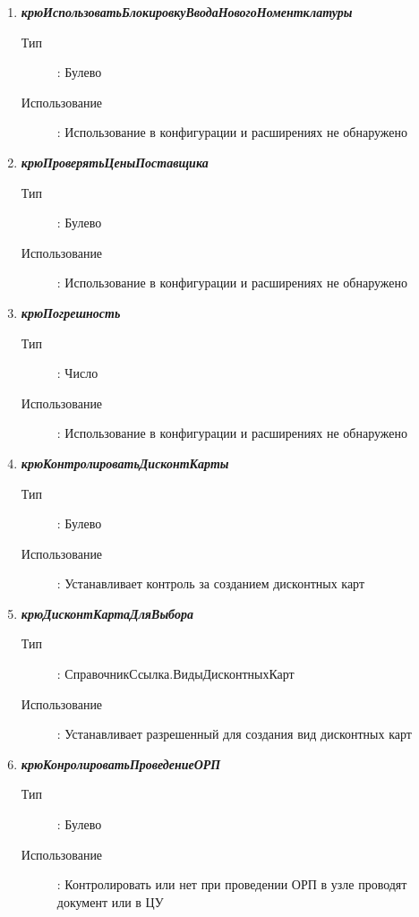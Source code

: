 \begin{enumerate}[label=(\arabic*)]
\vspace{\baselineskip}
\item \textbf{\textit{крюИспользоватьБлокировкуВводаНовогоНоментклатуры}}
\begin{description}
	\item[Тип] : Булево
	\item[Использование]: Использование в конфигурации и расширениях не обнаружено
\end{description}


\vspace{\baselineskip}
\item \textbf{\textit{крюПроверятьЦеныПоставщика}}
\begin{description}
	\item[Тип] : Булево
	\item[Использование]: Использование в конфигурации и расширениях не обнаружено
\end{description}

\vspace{\baselineskip}
\item \textbf{\textit{крюПогрешность}}
\begin{description}
	\item[Тип] : Число
	\item[Использование]: Использование в конфигурации и расширениях не обнаружено
\end{description}

\vspace{\baselineskip}
\item \textbf{\textit{крюКонтролироватьДисконтКарты}}
\begin{description}
	\item[Тип] : Булево
	\item[Использование]: Устанавливает контроль за созданием дисконтных карт
\end{description}

\vspace{\baselineskip}
\item \textbf{\textit{крюДисконтКартаДляВыбора}}
\begin{description}
	\item[Тип] : СправочникСсылка.ВидыДисконтныхКарт
	\item[Использование]: Устанавливает разрешенный для создания вид дисконтных карт
\end{description}

\vspace{\baselineskip}
\item \textbf{\textit{крюКонролироватьПроведениеОРП}}
\begin{description}
	\item[Тип] : Булево
	\item[Использование]: Контролировать или нет при проведении ОРП в узле проводят документ или в ЦУ
\end{description}



\end{enumerate}
